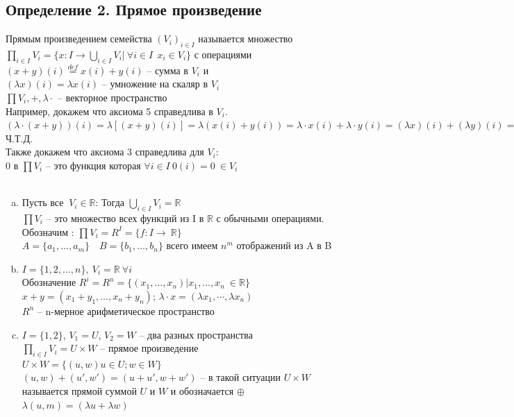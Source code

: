 \documentclass[a4paper,12pt]{article} %
\begin{document}
	\subsection{Определение 2. Прямое произведение}
	\indent Прямым произведением семейства $(V_i)_{i \in I}$ называется множество\\ $\underset{i \in I}{\prod} V_{i} = \{x: I \to \underset{i \in I}{\bigcup} V_i | \ \forall i \in I \ \ x_i \in V_i \}$ с операциями $(x+y)(i)  \stackrel{def}{=} x(i) + y(i)$ -- сумма в $V_i$ и \\$(\lambda x)(i) = \lambda x(i)$ -- умножение на скаляр в $V_i$\\
	$\prod V_{i}, +, \lambda \cdot$ -- векторное пространство\\
	
	Например, докажем что аксиома 5 справедлива в $V_i$.\\
	 $(\lambda \cdot (x + y))(i) = \lambda[(x+y)(i)] = \lambda(x(i) + y(i)) = \lambda\cdot x(i) + \lambda \cdot y(i) = (\lambda x)(i) + (\lambda y)(i) = (\lambda x + \lambda y) (i) \Rightarrow \lambda(x+y) = \lambda x + \lambda y$ Ч.Т.Д.\\
	 
	 Также докажем что аксиома 3 справедлива для $V_i$:\\
	 0 в ${\prod} V_{i}$ -- это функция которая $\forall i \in I \ 0(i) = 0 \ \in V_i$\\
	 
	 \textbf{}\\ 
	 \begin{enumerate}[a.]
	 	\item Пусть все $ \ V_i \in \mathbb{R}$: Тогда $\underset{i \in I}{\bigcup} V_i = \mathbb{R}$\\
	 	$\prod V_i$ -- это множество всех функций из I в $\mathbb{R}$ с обычными операциями.\\
	 	Обозначим : $\prod V_i = R^I = \{f: I \to \ \mathbb{R} \}$\\
	 	$A = \{a_1, \dots, a_m \} \quad B = \{b_1, \dots, b_n\}$ всего имеем $n^m$ отображений из A в B
	 	\item $I = \{1,2, \dots, n\},\ V_i = \mathbb{R} \ \forall i$\\
	 	Обозначение $R^i = R^n = \{(x_1, \dots, x_n)| x_1, \dotso, x_n \ \in \mathbb{R}\}$\\
	 	$x+y = (x_1 + y_1, \dotso, x_n + y_n)$;   $\lambda\cdot x = (\lambda x_1, \cdots, \lambda x_n)$\\
	 	$R^n$ -- n-мерное арифметическое пространство 
	 	\item $I = \{1,2\}$, $V_1 = U$, $V_2 = W$ -- два разных пространства\\
 	 	$\underset{i \in I}{\prod} V_i = U\times W$ -- прямое произведение\\
 	 	$U \times W = \{ (u,w) u \in U; w \in W\}$\\
 	 	$(u,w) + (u',w') = (u + u', w + w')$ -- в такой ситуации $U \times W$ называется прямой суммой  $U$ и $W$ и обозначается $\oplus $\\
 	 	$\lambda(u,m) = (\lambda u + \lambda w)$\\
 	 	\end{enumerate}
\end{document}
